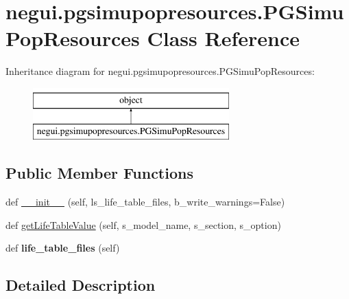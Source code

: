 \hypertarget{classnegui_1_1pgsimupopresources_1_1PGSimuPopResources}{}\section{negui.\+pgsimupopresources.\+P\+G\+Simu\+Pop\+Resources Class Reference}
\label{classnegui_1_1pgsimupopresources_1_1PGSimuPopResources}
Inheritance diagram for negui.\+pgsimupopresources.\+P\+G\+Simu\+Pop\+Resources\+:\begin{figure}[H]
\begin{center}
\leavevmode
\includegraphics[height=2.000000cm]{classnegui_1_1pgsimupopresources_1_1PGSimuPopResources}
\end{center}
\end{figure}
\subsection*{Public Member Functions}
\begin{DoxyCompactItemize}
\item 
def \hyperlink{classnegui_1_1pgsimupopresources_1_1PGSimuPopResources_a8e79c3f4c6c291a606c9f0c2f259a293}{\+\_\+\+\_\+init\+\_\+\+\_\+} (self, ls\+\_\+life\+\_\+table\+\_\+files, b\+\_\+write\+\_\+warnings=False)
\item 
def \hyperlink{classnegui_1_1pgsimupopresources_1_1PGSimuPopResources_a37fa2c7b4da84a2281231943a8e61c6c}{get\+Life\+Table\+Value} (self, s\+\_\+model\+\_\+name, s\+\_\+section, s\+\_\+option)
\item 
def {\bfseries life\+\_\+table\+\_\+files} (self)\hypertarget{classnegui_1_1pgsimupopresources_1_1PGSimuPopResources_a7f5ebba41ad2c1e20e3d31016b46e630}{}\label{classnegui_1_1pgsimupopresources_1_1PGSimuPopResources_a7f5ebba41ad2c1e20e3d31016b46e630}

\end{DoxyCompactItemize}


\subsection{Detailed Description}
\begin{DoxyVerb}\end{DoxyVerb}
 

